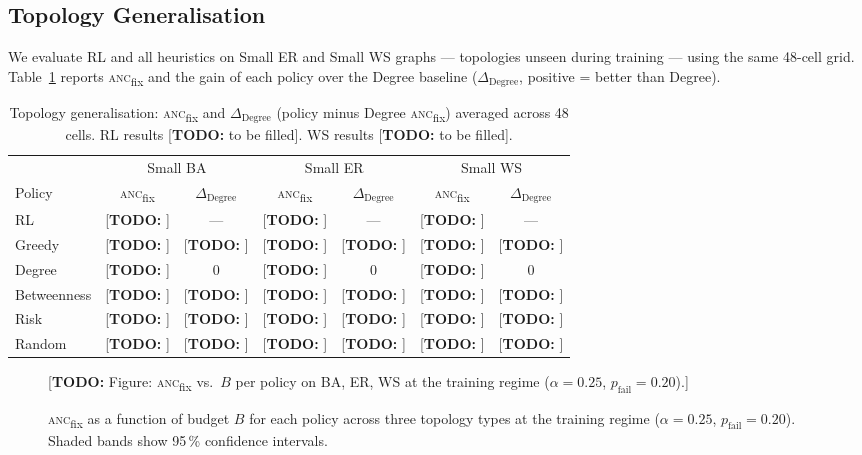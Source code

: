 \documentclass[11pt]{article}
\newcommand{\anc}{\textsc{anc}}
\newcommand{\ancfix}{\anc{}\textsubscript{fix}}
\newcommand{\todo}[1]{\textcolor{red!70!black}{[\textbf{TODO:} #1]}}
\newcommand{\pfail}{p_{\mathrm{fail}}}
\begin{document}
\subsection{Topology Generalisation}
\label{sec:topo_gen}

We evaluate RL and all heuristics on Small ER and Small WS graphs —
topologies unseen during training — using the same 48-cell grid.
Table~\ref{tab:topo_gen} reports \ancfix{} and the gain of each policy
over the Degree baseline ($\Delta_{\text{Degree}}$, positive = better
than Degree).

\begin{table}[htbp]
\centering
\caption{Topology generalisation: \ancfix{} and $\Delta_{\mathrm{Degree}}$
         (policy minus Degree \ancfix{}) averaged across 48 cells.
         RL results \todo{to be filled}.
         WS results \todo{to be filled}.}
\label{tab:topo_gen}
\setlength{\tabcolsep}{5pt}
\begin{tabular}{l cc cc cc}
\toprule
 & \multicolumn{2}{c}{Small BA}
 & \multicolumn{2}{c}{Small ER}
 & \multicolumn{2}{c}{Small WS} \\
\cmidrule(lr){2-3}\cmidrule(lr){4-5}\cmidrule(lr){6-7}
Policy      & \ancfix{}  & $\Delta_{\mathrm{Degree}}$
            & \ancfix{}  & $\Delta_{\mathrm{Degree}}$
            & \ancfix{}  & $\Delta_{\mathrm{Degree}}$ \\
\midrule
RL          & \todo{} & ---     & \todo{} & ---     & \todo{} & ---     \\
Greedy      & \todo{} & \todo{} & \todo{} & \todo{} & \todo{} & \todo{} \\
Degree      & \todo{} & $0$     & \todo{} & $0$     & \todo{} & $0$     \\
Betweenness & \todo{} & \todo{} & \todo{} & \todo{} & \todo{} & \todo{} \\
Risk        & \todo{} & \todo{} & \todo{} & \todo{} & \todo{} & \todo{} \\
Random      & \todo{} & \todo{} & \todo{} & \todo{} & \todo{} & \todo{} \\
\bottomrule
\end{tabular}
\end{table}

\begin{figure}[htbp]
\centering
\todo{Figure: \ancfix{} vs.\ $B$ per policy on BA, ER, WS at the
training regime ($\alpha=0.25$, $\pfail=0.20$).}
\caption{\ancfix{} as a function of budget $B$ for each policy across
         three topology types at the training regime
         ($\alpha=0.25$, $\pfail=0.20$).
         Shaded bands show 95\,\% confidence intervals.}
\label{fig:topo_gen}
\end{figure}
\end{document}
